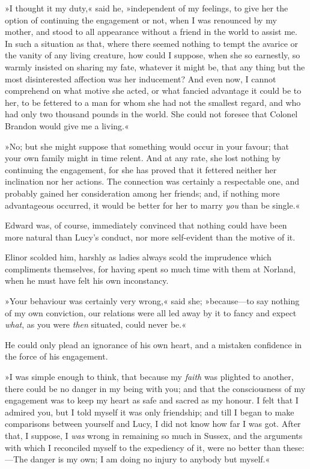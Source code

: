 »I thought it my duty,« said he, »independent of my feelings, to give her the option of continuing the engagement or not, when I was renounced by my mother, and stood to all appearance without a friend in the world to assist me. In such a situation as that, where there seemed nothing to tempt the avarice or the vanity of any living creature, how could I suppose, when she so earnestly, so warmly insisted on sharing my fate, whatever it might be, that any thing but the most disinterested affection was her inducement? And even now, I cannot comprehend on what motive she acted, or what fancied advantage it could be to her, to be fettered to a man for whom she had not the smallest regard, and who had only two thousand pounds in the world. She could not foresee that Colonel Brandon would give me a living.«

»No; but she might suppose that something would occur in your favour; that your own family might in time relent. And at any rate, she lost nothing by continuing the engagement, for she has proved that it fettered neither her inclination nor her actions. The connection was certainly a respectable one, and probably gained her consideration among her friends; and, if nothing more advantageous occurred, it would be better for her to marry \textit{you} than be single.«

Edward was, of course, immediately convinced that nothing could have been more natural than Lucy’s conduct, nor more self-evident than the motive of it.

Elinor scolded him, harshly as ladies always scold the imprudence which compliments themselves, for having spent so much time with them at Norland, when he must have felt his own inconstancy.

»Your behaviour was certainly very wrong,« said she; »because—to say nothing of my own conviction, our relations were all led away by it to fancy and expect \textit{what}, as you were \textit{then} situated, could never be.«

He could only plead an ignorance of his own heart, and a mistaken confidence in the force of his engagement.

»I was simple enough to think, that because my \textit{faith} was plighted to another, there could be no danger in my being with you; and that the consciousness of my engagement was to keep my heart as safe and sacred as my honour. I felt that I admired you, but I told myself it was only friendship; and till I began to make comparisons between yourself and Lucy, I did not know how far I was got. After that, I suppose, I \textit{was} wrong in remaining so much in Sussex, and the arguments with which I reconciled myself to the expediency of it, were no better than these:—The danger is my own; I am doing no injury to anybody but myself.«

